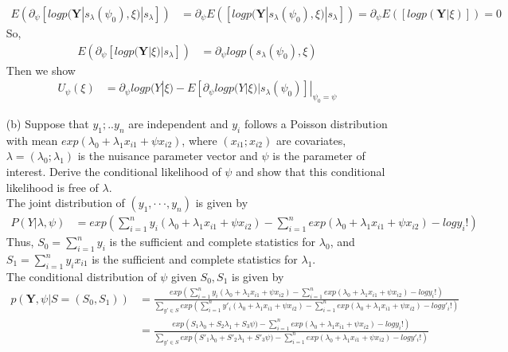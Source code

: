 \begin{itemize}
	\begin{align*}
		E \left(\partial_{\psi}[log  p(\textbf{Y}|s_{\lambda}(\psi_0), \xi)|s_{\lambda}]\right) & = \partial_{\psi} E \left([log  p(\textbf{Y}|s_{\lambda}(\psi_0), \xi)|s_{\lambda}]\right) = \partial_{\psi} E \left([log  p(\textbf{Y}| \xi)]\right)= 0
	\end{align*}      
	So,
	\begin{align*}
		E \left( \partial_{\psi}[log p(\textbf{Y}| \xi)| s_{\lambda}]\right) &= \partial_{\psi}log p(s_{\lambda}(\psi_0),\xi)
	\end{align*}
	Then we show
	\begin{align*}
		U_{\psi}(\xi) &= \partial_{\psi} log p(Y|\xi)- E[\partial_{\psi} log p(Y|\xi)|s_{\lambda}(\psi_0)]|_{\psi_0=\psi}
	\end{align*} 
	\item[(b)] Suppose that $y_1;.. y_n$ are independent and $y_i$ follows a Poisson distribution with mean $exp(\lambda_0 + \lambda_1x_{i1} +  \psi x_{i2})$, where $(x_{i1}; x_{i2})$ are covariates, $\lambda = (\lambda_0; \lambda_1)$ is the
	nuisance parameter vector and $\psi$  is the parameter of interest. Derive the conditional
	likelihood of $\psi$   and show that this conditional likelihood is free of $\lambda$.\\
	The joint distribution of $(y_1, · · · , y_n)$ is given by 
	\begin{align*}
		P(Y|\lambda, \psi)&=  exp \left( \sum_{i=1}^n y_i(\lambda_0 + \lambda_1x_{i1} +  \psi x_{i2}) - \sum_{i=1}^n exp(\lambda_0 + \lambda_1x_{i1} +  \psi x_{i2}) - log y_i! \right)
	\end{align*}
	Thus, $S_0 = \sum_{i=1}^n y_i$ is the sufficient and complete statistics for $\lambda_0$, and $S_1 = \sum_{i=1}^n y_i x_{i1}$ is the sufficient and complete statistics for $\lambda_1$.\\
	The conditional distribution of $\psi$ given $S_0, S_1$ is given by
	\begin{align*}
		p(\textbf{Y}, \psi|S=(S_0, S_1)) &= \frac{exp \left( \sum_{i=1}^n y_i(\lambda_0 + \lambda_1x_{i1} +  \psi x_{i2}) - \sum_{i=1}^n exp(\lambda_0 + \lambda_1x_{i1} +  \psi x_{i2}) - log y_i! \right)}{\sum_{y' \in S} exp \left( \sum_{i=1}^n y'_i(\lambda_0 + \lambda_1 x_{i1} +  \psi x_{i2}) - \sum_{i=1}^n exp(\lambda_0 + \lambda_1 x_{i1} +  \psi x_{i2}) - log y'_i! \right)}\\
		&= \frac{exp \left( S_1 \lambda_0 + S_2 \lambda_1 +  S_3 \psi) - \sum_{i=1}^n exp(\lambda_0 + \lambda_1x_{i1} +  \psi x_{i2}) - log y_i! \right)}{\sum_{y' \in S} exp \left( S'_1\lambda_0 + S'_2 \lambda_1 + S'_3 \psi) - \sum_{i=1}^n exp(\lambda_0 + \lambda_1 x_{i1} +  \psi x_{i2}) - log y'_i!\right)} \\

\end{align*}
\end{itemize}
